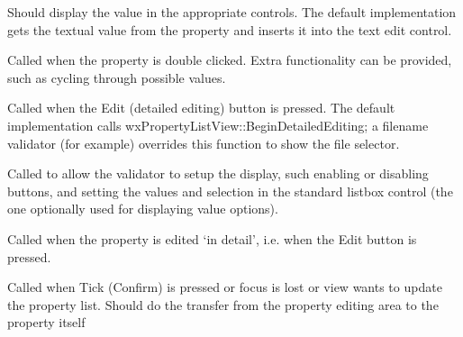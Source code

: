 Should display the value in the appropriate controls. The default implementation gets the
textual value from the property and inserts it into the text edit control.
 


Called when the property is double clicked. Extra functionality can be provided,
such as cycling through possible values.


 
Called when the Edit (detailed editing) button is pressed. The default implementation
calls wxPropertyListView::BeginDetailedEditing; a filename validator (for example) overrides
this function to show the file selector.



Called to allow the validator to setup the display, such enabling or disabling buttons, and
setting the values and selection in the standard listbox control (the one optionally used for displaying
value options).


 
Called when the property is edited `in detail', i.e. when the Edit button is pressed.



Called when Tick (Confirm) is pressed or focus is lost or view wants to update
the property list. Should do the transfer from the property editing area to the property itself


